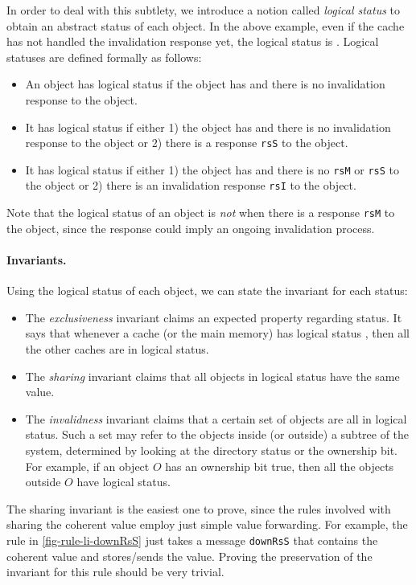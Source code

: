 \documentclass[sigplan,10pt,review,anonymous,screen]{acmart}\settopmatter{printfolios=true,printccs=false,printacmref=false}
\def\slstinline{\lstinline[basicstyle=\ttfamily\small]}
\begin{document}
In order to deal with this subtlety, we introduce a notion called \emph{logical status} to obtain an abstract status of each object.
In the above example, even if the cache has not handled the invalidation response yet, the logical status is \stI{}.
Logical statuses are defined formally as follows:
\begin{itemize}
\item An object has logical status \stM{} if the object has \stM{} and there is no invalidation response to the object.
\item It has logical status \stS{} if either 1) the object has \stS{} and there is no invalidation response to the object or 2) there is a response \slstinline{rsS} to the object.
\item It has logical status \stI{} if either 1) the object has \stI{} and there is no \slstinline{rsM} or \slstinline{rsS} to the object or 2) there is an invalidation response \slstinline{rsI} to the object.
\end{itemize}
Note that the logical status of an object is \emph{not} \stM{} when there is a response \slstinline{rsM} to the object, since the response could imply an ongoing invalidation process.

\paragraph{Invariants.}
Using the logical status of each object, we can state the invariant for each status:
\begin{itemize}
\item The \emph{exclusiveness} invariant claims an expected property regarding \stM{} status. It says that whenever a cache (or the main memory) has logical status \stM{}, then all the other caches are in logical \stI{} status.
\item The \emph{sharing} invariant claims that all objects in logical \stS{} status have the same value.
\item The \emph{invalidness} invariant claims that a certain set of objects are all in logical \stI{} status. Such a set may refer to the objects inside (or outside) a subtree of the system, determined by looking at the directory status or the ownership bit. For example, if an object $O$ has an ownership bit true, then all the objects outside $O$ have logical \stI{} status.
\end{itemize}

The sharing invariant is the easiest one to prove, since the rules involved with sharing the coherent value employ just simple value forwarding.
For example, the rule in \autoref{fig-rule-li-downRsS} just takes a message \slstinline{downRsS} that contains the coherent value and stores/sends the value.
Proving the preservation of the invariant for this rule should be very trivial.
\end{document}
